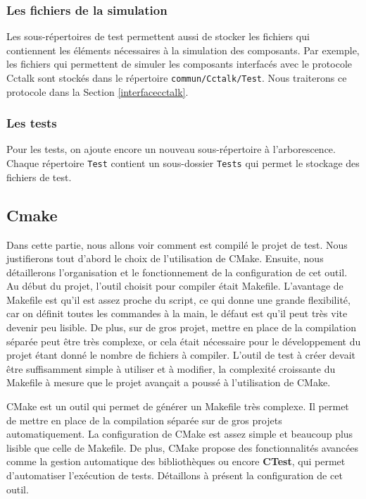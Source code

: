 \documentclass[a4paper]{article}
\begin{document}
\subsubsection{Les fichiers de la simulation}

Les sous-répertoires de test permettent aussi de stocker les fichiers qui
contiennent les éléments nécessaires à la simulation des composants. Par exemple,
les fichiers qui permettent de simuler les composants interfacés avec le
protocole Cctalk sont stockés dans le répertoire \verb|commun/Cctalk/Test|. Nous
traiterons ce protocole dans la Section \ref{interfacecctalk}.

\subsubsection{Les tests}

Pour les tests, on ajoute encore un nouveau sous-répertoire à l'arborescence.
Chaque répertoire \verb|Test| contient un sous-dossier \verb|Tests| qui permet le
stockage des fichiers de test.

\subsection{Cmake}
\label{cmake}

Dans cette partie, nous allons voir comment est compilé le projet de test. Nous
justifierons tout d'abord le choix de l'utilisation de CMake. Ensuite, nous
détaillerons l'organisation et le fonctionnement de la configuration de cet
outil.\\

Au début du projet, l'outil choisit pour compiler était Makefile. L'avantage de
Makefile est qu'il est assez proche du script, ce qui donne une grande
flexibilité, car on définit toutes les commandes à la main, le défaut est qu'il
peut très vite devenir peu lisible. De plus, sur de gros projet, mettre en place
de la compilation séparée peut être très complexe, or cela était nécessaire pour
le développement du projet étant donné le nombre de fichiers à compiler. L'outil
de test à créer devait être suffisamment simple à utiliser et à modifier, la
complexité croissante du Makefile à mesure que le projet avançait a poussé à
l'utilisation de CMake.

CMake est un outil qui permet de générer un Makefile très complexe. Il permet de
mettre en place de la compilation séparée sur de gros projets automatiquement.
La configuration de CMake est assez simple et beaucoup plus lisible que celle de
Makefile. De plus, CMake propose des fonctionnalités avancées comme la gestion
automatique des bibliothèques ou encore \textbf{CTest}, qui permet d'automatiser
l'exécution de tests. Détaillons à présent la configuration de cet outil.
\end{document}
